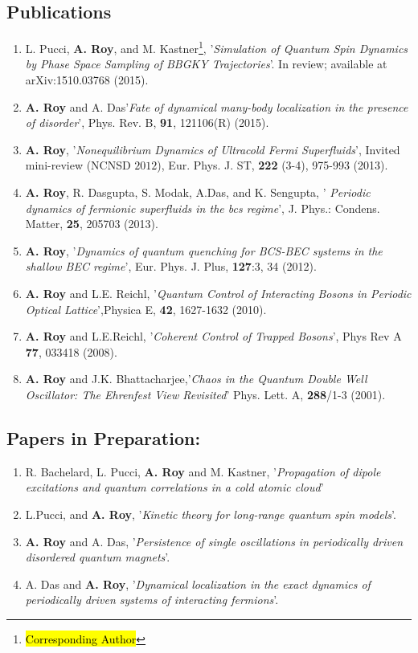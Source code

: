 \documentclass[a4paper,11pt,color]{article}
\begin{document}
\subsection{Publications}
\begin{enumerate}
\item
L. Pucci, \textbf{A. Roy}, and M. Kastner\footnote{\large{\hl{Corresponding Author}}}, '\textit{Simulation of Quantum Spin Dynamics by Phase Space Sampling of BBGKY Trajectories}'. In review; available at arXiv:1510.03768 (2015).
\item
\textbf{A. Roy} and A. Das\footnotemark[\value{footnote}] '\textit{Fate of dynamical many-body localization in the presence of disorder}', Phys. Rev. B, {\bf 91}, 121106(R) (2015).
\item
\textbf{A. Roy}\footnotemark[\value{footnote}], '\textit{Nonequilibrium Dynamics of Ultracold Fermi Superfluids}', Invited mini-review (NCNSD $2012$),
Eur. Phys. J. ST, {\bf 222} (3-4), 975-993 (2013).
\item
\textbf{A. Roy}\footnotemark[\value{footnote}] , R. Dasgupta, S. Modak, A.Das, and K. Sengupta, '\textit{ Periodic dynamics of fermionic superfluids in the bcs regime}',  J. Phys.: Condens. Matter, {\bf 25}, 205703 (2013).
\item
\textbf{A. Roy}\footnotemark[\value{footnote}] , '\textit{Dynamics of quantum quenching for BCS-BEC systems in the shallow BEC regime}', Eur. Phys. J. {Plus}, {\bf 127}:3, 34 (2012).
 \item 
\textbf{A. Roy} and L.E. Reichl\footnotemark[\value{footnote}], '\textit{Quantum Control  of Interacting Bosons in Periodic Optical Lattice}',Physica {E}, {\bf 42}, 1627-1632 (2010).
\item
\textbf{A. Roy} and L.E.Reichl\footnotemark[\value{footnote}], '\textit{Coherent Control of Trapped Bosons}', Phys Rev {A} {\bf 77}, 033418 (2008).
\item
\textbf{A. Roy} and J.K. Bhattacharjee\footnotemark[\value{footnote}],'\textit{Chaos in the Quantum Double Well Oscillator: The Ehrenfest View Revisited}' Phys. Lett. {A}, {\bf 288}/1-3 (2001).
\end{enumerate}
 
\subsection{Papers in Preparation:}
\begin{enumerate}
\item
R. Bachelard, L. Pucci,\textbf{ A. Roy} and M. Kastner, '\textit{Propagation of dipole excitations and quantum correlations in a cold atomic cloud}'
\item
L.Pucci, and \textbf{A. Roy}, '\textit{Kinetic theory for long-range quantum spin models}'.
\item
\textbf{A. Roy} and A. Das, '\textit{Persistence of single oscillations in periodically driven disordered quantum magnets}'.
\item
A. Das and \textbf{A. Roy}, '\textit{Dynamical localization in the exact dynamics of periodically driven systems of interacting fermions}'.
\end{enumerate}
\end{document}

